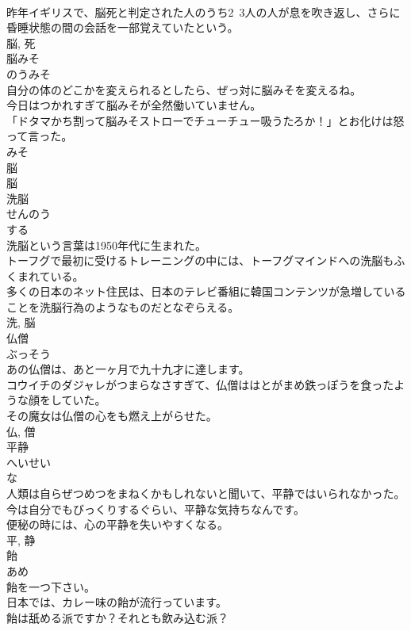 \documentclass[8pt]{extreport}
\begin{document}
\begin{CJK}{UTF8}{min}
\\	昨年イギリスで、脳死と判定された人のうち2~3人の人が息を吹き返し、さらに昏睡状態の間の会話を一部覚えていたという。	
\\	脳, 死	
\\	脳みそ	
\\	のうみそ	
\\	自分の体のどこかを変えられるとしたら、ぜっ対に脳みそを変えるね。	
\\	今日はつかれすぎて脳みそが全然働いていません。	
\\	「ドタマかち割って脳みそストローでチューチュー吸うたろか！」とお化けは怒って言った。	
\\	みそ 
\\	脳 
\\	脳	
\\	洗脳	
\\	せんのう	
\\	する 
\\	洗脳という言葉は1950年代に生まれた。	
\\	トーフグで最初に受けるトレーニングの中には、トーフグマインドへの洗脳もふくまれている。	
\\	多くの日本のネット住民は、日本のテレビ番組に韓国コンテンツが急増していることを洗脳行為のようなものだとなぞらえる。	
\\	洗, 脳	
\\	仏僧	
\\	ぶっそう	
\\	あの仏僧は、あと一ヶ月で九十九才に達します。	
\\	コウイチのダジャレがつまらなさすぎて、仏僧ははとがまめ鉄っぽうを食ったような顔をしていた。	
\\	その魔女は仏僧の心をも燃え上がらせた。	
\\	仏, 僧	
\\	平静	
\\	へいせい	
\\	な 
\\	人類は自らぜつめつをまねくかもしれないと聞いて、平静ではいられなかった。	
\\	今は自分でもびっくりするぐらい、平静な気持ちなんです。	
\\	便秘の時には、心の平静を失いやすくなる。	
\\	平, 静	
\\	飴	
\\	あめ	
\\	飴を一つ下さい。	
\\	日本では、カレー味の飴が流行っています。	
\\	飴は舐める派ですか？それとも飲み込む派？	

\end{CJK}
\end{document}
